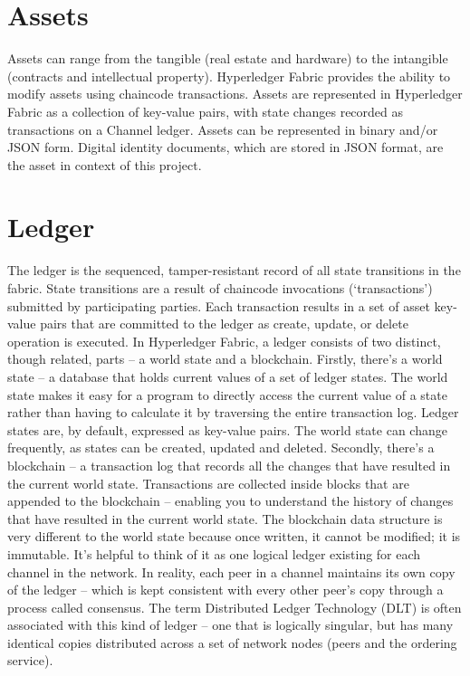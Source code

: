 \section{Assets}
Assets can range from the tangible (real estate and hardware) to the intangible (contracts and intellectual property). Hyperledger Fabric provides the ability to modify assets using chaincode transactions. Assets are represented in Hyperledger Fabric as a collection of key-value pairs, with state changes recorded as transactions on a Channel ledger. Assets can be represented in binary and/or JSON form. Digital identity documents, which are stored in JSON format, are the asset in context of this project.
\section{Ledger}
The ledger is the sequenced, tamper-resistant record of all state transitions in the fabric. State transitions are a result of chaincode invocations (‘transactions’) submitted by participating parties. 
Each transaction results in a set of asset key-value pairs that are committed to the ledger as create, update, or delete operation is executed. 
In Hyperledger Fabric, a ledger consists of two distinct, though related, parts – a world state and a blockchain. 
Firstly, there’s a world state – a database that holds current values of a set of ledger states. The world state makes it easy for a program to directly access the current value of a state rather than having to calculate it by traversing the entire transaction log. Ledger states are, by default, expressed as key-value pairs. The world state can change frequently, as states can be created, updated and deleted.
Secondly, there’s a blockchain – a transaction log that records all the changes that have resulted in the current world state. Transactions are collected inside blocks that are appended to the blockchain – enabling you to understand the history of changes that have resulted in the current world state. The blockchain data structure is very different to the world state because once written, it cannot be modified; it is immutable.\newline
It’s helpful to think of it as one logical ledger existing for each channel in the network. In reality, each peer in a channel maintains its own copy of the ledger – which is kept consistent with every other peer’s copy through a process called consensus. The term Distributed Ledger Technology (DLT) is often associated with this kind of ledger – one that is logically singular, but has many identical copies distributed across a set of network nodes (peers and the ordering service).
